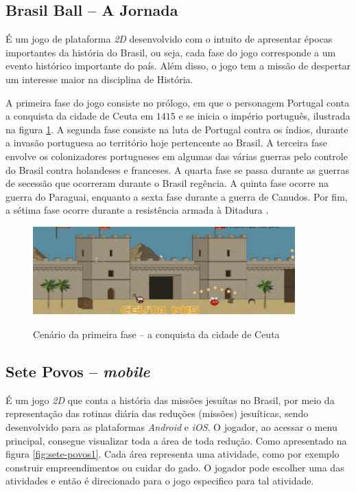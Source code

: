 \subsection{Brasil Ball -- A Jornada}

É um jogo de plataforma \textit{2D} desenvolvido com o intuito de apresentar épocas importantes da história do Brasil, ou seja, cada fase do jogo corresponde a um evento histórico importante do país. Além disso, o jogo tem a missão de despertar um interesse maior na disciplina de História.

A primeira fase do jogo consiste no prólogo, em que o personagem Portugal conta a conquista da cidade de Ceuta em $1415$ e se inicia o império português, ilustrada na figura \ref{fig:brasil-ball}. A segunda fase consiste na luta de Portugal contra os índios, durante a invasão portuguesa ao território hoje pertencente ao Brasil. A terceira fase envolve os colonizadores portugueses em algumas das várias guerras pelo controle do Brasil contra holandeses e franceses. A quarta fase se passa durante as guerras de secessão que ocorreram durante o Brasil regência. A quinta fase ocorre na guerra do Paraguai, enquanto a sexta fase durante a guerra de Canudos. Por fim, a sétima fase ocorre durante a resistência armada à Ditadura \cite{bib:bb2016}.

\begin{figure}[H]
	\centering
	\caption{Cenário da primeira fase -- a conquista da cidade de Ceuta}
	\includegraphics[width=0.9\textwidth]{figuras/brasil_ball.png}
	\label{fig:brasil-ball}
	{}
\end{figure}

\subsection{Sete Povos -- \textit{mobile}}

É um jogo \textit{2D} que conta a história das missões jesuítas no Brasil, por meio da representação das rotinas diária das reduções (missões) jesuíticas, sendo desenvolvido para as plataformas \textit{Android} e \textit{iOS}. O jogador, ao acessar o menu principal, consegue visualizar toda a área de toda redução. Como apresentado na figura \ref{fig:sete-povos1}. Cada área representa uma atividade, como por exemplo construir empreendimentos ou cuidar do gado. O jogador pode escolher uma das atividades e então é direcionado para o jogo especifico para tal atividade.

